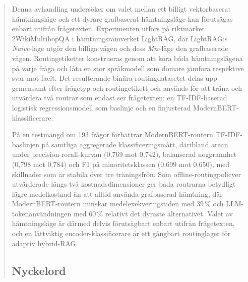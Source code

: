 \documentclass[english, bibtex]{kththesis}               %
\newcommand*{\generalExpl}[1]{\todo[inline]{#1}}
\newcommand*{\engExpl}[1]{\todo[inline, backgroundcolor=kth-lightgreen40]{#1}} %
\newcommand*{\sweExpl}[1]{\todo[inline, backgroundcolor=kth-lightblue40]{#1}}  %
\renewcommand\generalExpl[1]{}
\renewcommand\engExpl[1]{}
\renewcommand\sweExpl[1]{}
\numberwithin{listing}{chapter}
\begin{document}
\begin{abstract}
\begin{scontents}[store-env=abstracts,print-env=true]
Denna avhandling undersöker om valet mellan ett billigt vektorbaserat hämtningsläge och ett dyrare grafbaserat hämtningsläge kan förutsägas enbart utifrån frågetexten. Experimenten utförs på riktmärket 2WikiMultihopQA i hämtningsramverket LightRAG, där LightRAG:s \emph{Naive}-läge utgör den billiga vägen och dess \emph{Mix}-läge den grafbaserade vägen. Routingetiketter konstrueras genom att köra båda hämtningslägena på varje fråga och låta en stor språkmodell som domare jämföra respektive svar mot facit. Det resulterande binära routingdatasetet delas upp gemensamt efter frågetyp och routingetikett och används för att träna och utvärdera två routrar som endast ser frågetexten: en TF-IDF-baserad logistisk regressionsmodell som baslinje och en finjusterad ModernBERT-klassificerare.

På en testmängd om 193 frågor förbättrar ModernBERT-routern TF-IDF-baslinjen på samtliga aggregerade klassificeringsmått, däribland arean under precision-recall-kurvan (0,769 mot 0,742), balanserad noggrannhet (0,798 mot 0,784) och F1 på minoritetsklassen (0,699 mot 0,650), med skillnader som är stabila över tre träningsfrön. Som offline-routingpolicyer utvärderade längs två kostnadsdimensioner ger båda routrarna betydligt lägre medelkostnad än att alltid använda grafbaserad hämtning, där ModernBERT-routern minskar medelexekveringstiden med 39\,\% och LLM-tokenanvändningen med 60\,\% relativt det dyraste alternativet. Valet av hämtningsläge är därmed delvis förutsägbart enbart utifrån frågetexten, och en lättviktig encoder-klassificerare är ett gångbart routinglager för adaptiv hybrid-RAG.
\end{scontents}
\subsection*{Nyckelord}
\begin{scontents}[store-env=keywords,print-env=true]
\end{scontents}
\sweExpl{Nyckelord som beskriver innehållet i uppsatsen eller rapporten}
\end{abstract}
\cleardoublepage
{}


\engExpl{If you add the class option \texttt{includeExtraAbstracts} in your \texttt{docuemntclass}, then you can enable abstracts/summaries in a number of languages. Include those versions of abstracts that you need.}
\generalExpl{If you are an exchange student, use the relevant language or languages for abstracts for your home university, as this will often avoid the need for writing another thesis for your home university.}
\generalExpl{If you are fluent in other languages, feel free to add the abstracts in one or more of them.}
\end{document}
